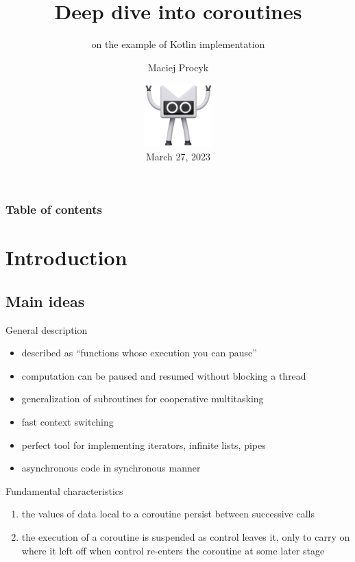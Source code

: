 \documentclass[hyperref={pdfpagelabels=false},xcolor={dvipsnames},compress,onlytextwidth]{beamer}
\title{Deep dive into coroutines}
\subtitle{on the example of Kotlin implementation}
\author{Maciej Procyk}
\date{\includegraphics[width=75pt]{images/happy}\\March 27, 2023}
\begin{document}
    \logo{}

    {
        \begin{frame}
            \maketitle
        \end{frame}
    }

    \begin{frame}
        \frametitle{Table of contents}
        \tableofcontents
    \end{frame}


    \section{Introduction}

    \subsection{Main ideas}

    \begin{frame}{General description}
        \begin{itemize}
            \item described as ``functions whose execution you can pause''\pause
            \item computation can be paused and resumed without blocking a thread\pause
            \item generalization of subroutines for cooperative multitasking\pause
            \item fast context switching\pause
            \item perfect tool for implementing iterators, infinite lists, pipes\pause
            \item asynchronous code in synchronous manner
        \end{itemize}
    \end{frame}

    \begin{frame}{Fundamental characteristics}
        \begin{enumerate}
            \item the values of data local to a coroutine persist between successive calls\pause
            \item the execution of a coroutine is suspended as control leaves it, only to carry on where it left off when control re-enters the coroutine at some later stage
        \end{enumerate}
    \end{frame}
\end{document}
